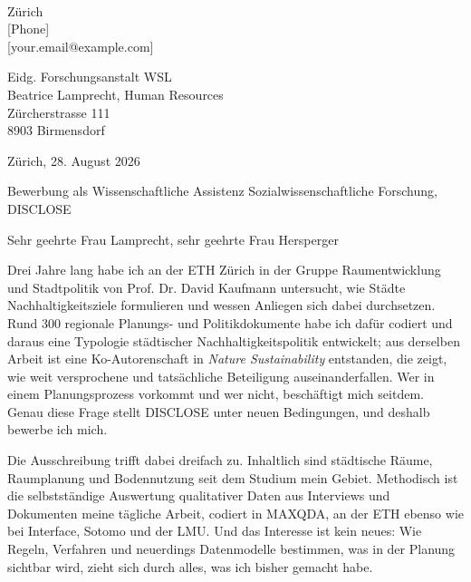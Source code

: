 \documentclass[11pt,a4paper]{article}
\begin{document}
\pagestyle{empty}


\begin{flushleft}
[First] [Last]\\
Zürich\\
{[Phone]}\\
{[your.email@example.com]}
\end{flushleft}

\begin{flushright}
Eidg. Forschungsanstalt WSL\\
Beatrice Lamprecht, Human Resources\\
Zürcherstrasse 111\\
8903 Birmensdorf
\end{flushright}

Zürich, 28. August 2026

\vspace{0.2em}

Bewerbung als Wissenschaftliche Assistenz Sozialwissenschaftliche Forschung, DISCLOSE

Sehr geehrte Frau Lamprecht, sehr geehrte Frau Hersperger

Drei Jahre lang habe ich an der ETH Zürich in der Gruppe Raumentwicklung und Stadtpolitik von Prof. Dr. David Kaufmann untersucht, wie Städte Nachhaltigkeitsziele formulieren und wessen Anliegen sich dabei durchsetzen. Rund 300 regionale Planungs- und Politikdokumente habe ich dafür codiert und daraus eine Typologie städtischer Nachhaltigkeitspolitik entwickelt; aus derselben Arbeit ist eine Ko-Autorenschaft in \textit{Nature Sustainability} entstanden, die zeigt, wie weit versprochene und tatsächliche Beteiligung auseinanderfallen. Wer in einem Planungsprozess vorkommt und wer nicht, beschäftigt mich seitdem. Genau diese Frage stellt DISCLOSE unter neuen Bedingungen, und deshalb bewerbe ich mich.

Die Ausschreibung trifft dabei dreifach zu. Inhaltlich sind städtische Räume, Raumplanung und Bodennutzung seit dem Studium mein Gebiet. Methodisch ist die selbstständige Auswertung qualitativer Daten aus Interviews und Dokumenten meine tägliche Arbeit, codiert in MAXQDA, an der ETH ebenso wie bei Interface, Sotomo und der LMU. Und das Interesse ist kein neues: Wie Regeln, Verfahren und neuerdings Datenmodelle bestimmen, was in der Planung sichtbar wird, zieht sich durch alles, was ich bisher gemacht habe.
\end{document}
